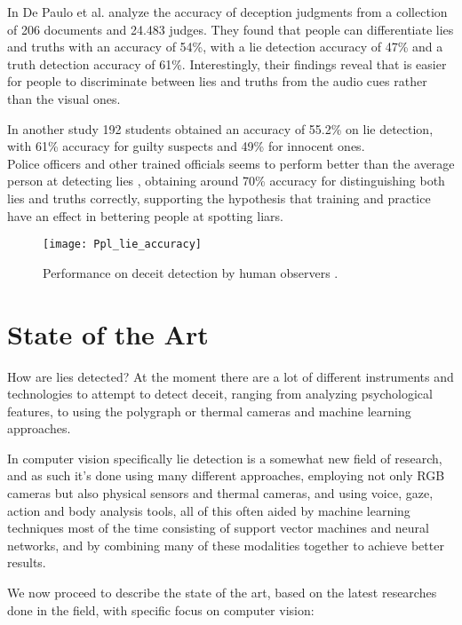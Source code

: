 In \cite{BondDePauloAccuracy} De Paulo et al. analyze the accuracy of deception judgments from a collection of 206 documents and 24.483 judges. They found that people can differentiate lies and truths with an accuracy of 54\%, with a lie detection accuracy of 47\% and a truth detection accuracy of 61\%. Interestingly, their findings reveal that is easier for people to discriminate between lies and truths from the audio cues rather than the visual ones.

In another study \cite{HartwigGranhag} 192 students obtained an accuracy of 55.2\% on lie detection, with 61\% accuracy for guilty suspects and 49\% for innocent ones.\\
Police officers and other trained officials seems to perform better than the average person at detecting lies \cite{VrijPoliceDetect}, obtaining around 70\% accuracy for distinguishing both lies and truths correctly, supporting the hypothesis that training and practice have an effect in bettering people at spotting liars.

\begin{figure}[H]
	\centering
	\texttt{[image: Ppl\_lie\_accuracy]}
	\caption{Performance on deceit detection by human observers \cite{SU201652}.}
\end{figure}
 
\clearpage

\section{State of the Art} \label{sota}
How are lies detected? At the moment there are a lot of different instruments and technologies to attempt to detect deceit, ranging from analyzing psychological features, to using the polygraph or thermal cameras and machine learning approaches.

In computer vision specifically lie detection is a somewhat new field of research, and as such it's done using many different approaches, employing not only RGB cameras but also physical sensors and thermal cameras, and using voice, gaze, action and body analysis tools, all of this often aided by machine learning techniques most of the time consisting of support vector machines and neural networks, and by combining many of these modalities together to achieve better results.

We now proceed to describe the state of the art, based on the latest researches done in the field, with specific focus on computer vision:

